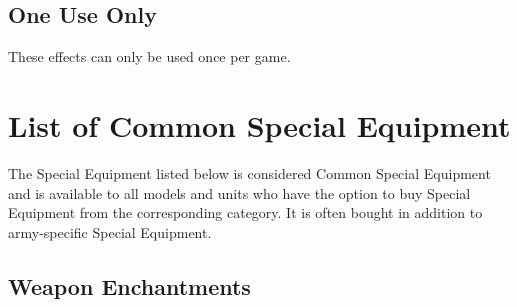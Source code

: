 \subsection{One Use Only}
\label{one_use_only}

These effects can only be used once per game. 

\newpage
\section{List of Common Special Equipment}

The Special Equipment listed below is considered Common Special Equipment and is available to all models and units who have the option to buy Special Equipment from the corresponding category. It is often bought in addition to army-specific Special Equipment.

\subsection{Weapon Enchantments}

